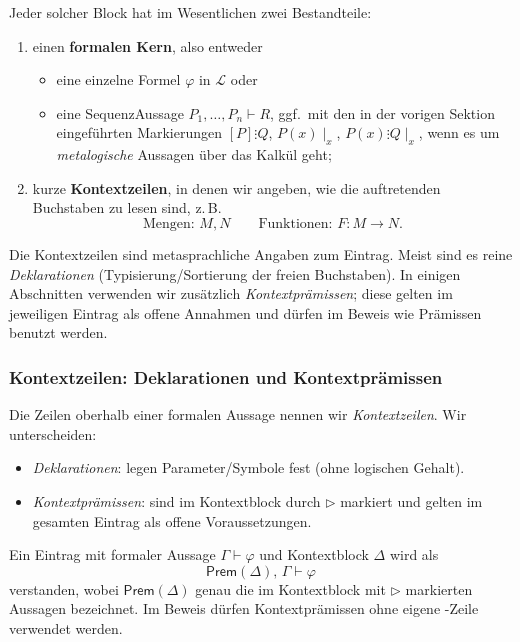 \documentclass[main.tex]{subfiles}
\begin{document}
Jeder solcher Block hat im Wesentlichen zwei Bestandteile:
\begin{enumerate}
  \item einen \textbf{formalen Kern}, also entweder
        \begin{itemize}
          \item eine einzelne Formel \(\varphi\) in \(\mathcal L\) oder
          \item eine Sequenz\-Aussage \(P_1,\dots,P_n \vdash R\),
                ggf.\ mit den in der vorigen Sektion eingeführten
                Markierungen \([P]\vdots Q\), \(P(x)\mid_x\),
                \(P(x)\vdots Q\mid_x\), wenn es um
                \emph{metalogische} Aussagen über das Kalkül geht;
        \end{itemize}
  \item kurze \textbf{Kontextzeilen}, in denen wir angeben, wie die
        auftretenden Buchstaben zu lesen sind, z.\,B.
        \[
          \text{Mengen: } M,N \qquad
          \text{Funktionen: } F\colon M\to N.
        \]
\end{enumerate}

Die Kontextzeilen sind metasprachliche Angaben zum Eintrag.
Meist sind es reine \emph{Deklarationen} (Typisierung/Sortierung der freien
Buchstaben). In einigen Abschnitten verwenden wir zusätzlich
\emph{Kontextprämissen}; diese gelten im jeweiligen Eintrag als offene
Annahmen und dürfen im Beweis wie Prämissen benutzt werden.

\subsubsection{Kontextzeilen: Deklarationen und Kontextprämissen}

\begin{remark}
Die Zeilen oberhalb einer formalen Aussage nennen wir \emph{Kontextzeilen}.
Wir unterscheiden:
\begin{itemize}
\item \emph{Deklarationen}: legen Parameter/Symbole fest (ohne logischen Gehalt).
\item \emph{Kontextprämissen}: sind im Kontextblock durch \(\triangleright\) markiert und
gelten im gesamten Eintrag als offene Voraussetzungen.
\end{itemize}
Ein Eintrag mit formaler Aussage \(\Gamma \vdash \varphi\) und Kontextblock \(\Delta\)
wird als
\[
  \mathsf{Prem}(\Delta),\,\Gamma \vdash \varphi
\]
verstanden, wobei \(\mathsf{Prem}(\Delta)\) genau die im Kontextblock mit
\(\triangleright\) markierten Aussagen bezeichnet.
Im Beweis dürfen Kontextprämissen ohne eigene \rA-Zeile verwendet werden.
\end{remark}
\end{document}
